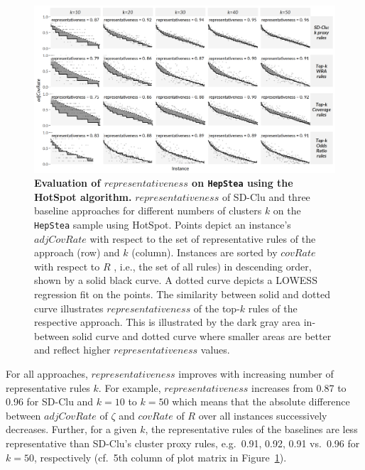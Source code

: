 \documentclass[
  oneside]{book}
\begin{document}
\begin{figure}[h]

{\centering \includegraphics[width=1\linewidth]{figures/04-representativeness-hepStea-hotSpot} 

}

\caption{\textbf{Evaluation of \(representativeness\) on \texttt{HepStea} using the HotSpot algorithm.} \(representativeness\) of SD-Clu and three baseline approaches for different numbers of clusters \(k\) on the \texttt{HepStea} sample using HotSpot. Points depict an instance's \(adjCovRate\) with respect to the set of representative rules of the approach (row) and \(k\) (column). Instances are sorted by \(covRate\) with respect to \(R\) , i.e., the set of all rules) in descending order, shown by a solid black curve. A dotted curve depicts a LOWESS regression fit on the points. The similarity between solid and dotted curve illustrates \(representativeness\) of the top-\(k\) rules of the respective approach. This is illustrated by the dark gray area in-between solid curve and dotted curve where smaller areas are better and reflect higher \(representativeness\) values.}\label{fig:04-representativeness-hepStea-hotSpot}
\end{figure}

For all approaches, \(representativeness\) improves with increasing number of representative rules \(k\).
For example, \(representativeness\) increases from 0.87 to 0.96 for SD-Clu and \(k=10\) to \(k=50\) which means that the absolute difference between \(adjCovRate\) of \(\zeta\) and \(covRate\) of \(R\) over all instances successively decreases.
Further, for a given \(k\), the representative rules of the baselines are less representative than SD-Clu's cluster proxy rules, e.g.~0.91, 0.92, 0.91 vs.~0.96 for \(k=50\), respectively (cf.~5th column of plot matrix in Figure~\ref{fig:04-representativeness-hepStea-hotSpot}).
\end{document}
